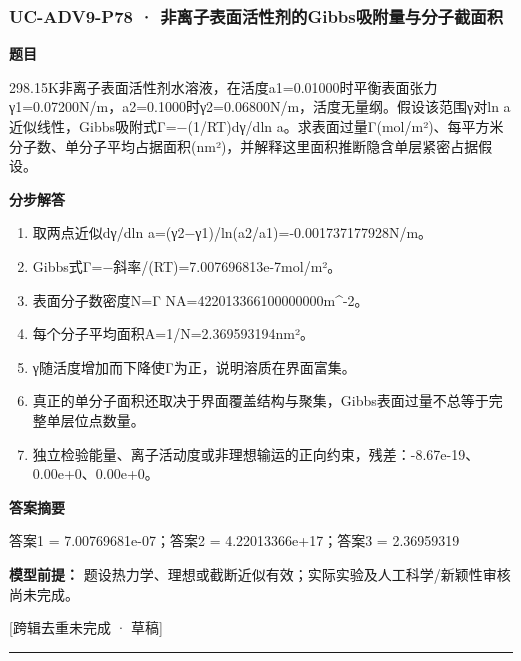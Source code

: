 \documentclass[UTF8,11pt,a4paper]{ctexart}
\begin{document}
\subsubsection*{UC-ADV9-P78 · 非离子表面活性剂的Gibbs吸附量与分子截面积}
\noindent\textbf{题目}\par
298.15K非离子表面活性剂水溶液，在活度a1=0.01000时平衡表面张力γ1=0.07200N/m，a2=0.1000时γ2=0.06800N/m，活度无量纲。假设该范围γ对ln a近似线性，Gibbs吸附式Γ=−(1/RT)dγ/dln a。求表面过量Γ(mol/m²)、每平方米分子数、单分子平均占据面积(nm²)，并解释这里面积推断隐含单层紧密占据假设。\par
\medskip\noindent\textbf{分步解答}
\begin{enumerate}
\item 取两点近似dγ/dln a=(γ2−γ1)/ln(a2/a1)=-0.001737177928N/m。
\item Gibbs式Γ=−斜率/(RT)=7.007696813e-7mol/m²。
\item 表面分子数密度N=Γ NA=422013366100000000m\textasciicircum{}-2。
\item 每个分子平均面积A=1/N=2.369593194nm²。
\item γ随活度增加而下降使Γ为正，说明溶质在界面富集。
\item 真正的单分子面积还取决于界面覆盖结构与聚集，Gibbs表面过量不总等于完整单层位点数量。
\item 独立检验能量、离子活动度或非理想输运的正向约束，残差：-8.67e-19、0.00e+0、0.00e+0。
\end{enumerate}
\noindent\textbf{答案摘要}\par
答案1 = 7.00769681e-07；答案2 = 4.22013366e+17；答案3 = 2.36959319\par
\noindent\textbf{模型前提：}
题设热力学、理想或截断近似有效；实际实验及人工科学/新颖性审核尚未完成。\par
\noindent\textcolor{red!65!black}{[跨辑去重未完成 · 草稿]} \par
\medskip\hrule\medskip
{}
\end{document}
